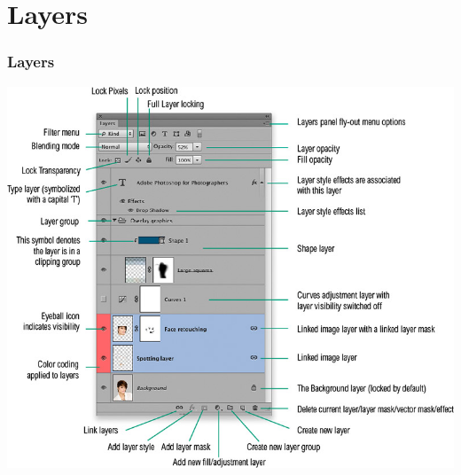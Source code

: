 \documentclass{beamer}
\begin{document}
	\section{Layers}

	\begin{frame}
		\frametitle{Layers}
		\begin{center}
			\includegraphics[width=.7\textwidth]{images/layers.jpg}
		\end{center}
	\end{frame}
	
\end{document}
